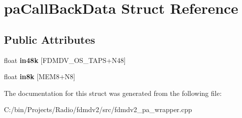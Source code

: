 \hypertarget{structpa_call_back_data}{\section{pa\-Call\-Back\-Data Struct Reference}
\label{structpa_call_back_data}
}
\subsection*{Public Attributes}
\begin{DoxyCompactItemize}
\item 
\hypertarget{structpa_call_back_data_a2f3083066c414621a834d3af98aa26cf}{float {\bfseries in48k} \mbox{[}F\-D\-M\-D\-V\-\_\-\-O\-S\-\_\-\-T\-A\-P\-S+N48\mbox{]}}\label{structpa_call_back_data_a2f3083066c414621a834d3af98aa26cf}

\item 
\hypertarget{structpa_call_back_data_a1eaf4a649210c178b8671653b89e2141}{float {\bfseries in8k} \mbox{[}M\-E\-M8+N8\mbox{]}}\label{structpa_call_back_data_a1eaf4a649210c178b8671653b89e2141}

\end{DoxyCompactItemize}


The documentation for this struct was generated from the following file\-:\begin{DoxyCompactItemize}
\item 
C\-:/bin/\-Projects/\-Radio/fdmdv2/src/fdmdv2\-\_\-pa\-\_\-wrapper.\-cpp\end{DoxyCompactItemize}
